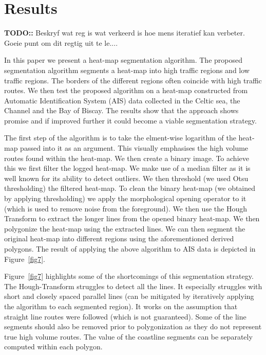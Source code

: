\documentclass{article}
\begin{document}
 
 
 \section{Results}
 \textbf{TODO::} Beskryf wat reg is wat verkeerd is hoe mens iteratief kan verbeter. Goeie punt om dit regtig uit te le....
 
 
In this paper we present a heat-map segmentation algorithm. The proposed segmentation algorithm
segments a heat-map into high traffic regions and low traffic regions. The borders of the different regions often coincide with high traffic routes. We then test the proposed 
algorithm on a heat-map constructed from Automatic Identification System (AIS) data collected in the Celtic sea, the Channel and the Bay of Biscay. The results show that the approach shows promise and if improved further 
it could become a viable segmentation strategy.
 
The first step of the algorithm is to take the elment-wise logarithm of the heat-map passed into it as an argument. This visually emphasises the high volume routes found within the heat-map. We then 
create a binary image. To achieve this we first filter the logged heat-map. We make use of a median filter as it is well known for its ability to detect outliers. We then threshold (we used Otsu thresholding) the  
filtered heat-map. To clean the binary heat-map (we obtained by applying thresholding) we apply the morphological opening operator to it (which is used to remove noise from the foreground).
We then use the Hough Transform to extract the longer lines from the opened binary heat-map. We then polygonize the heat-map using the extracted lines. We can then 
segment the original heat-map into different regions using the aforementioned derived polygons. The result of applying the above algorithm to AIS data is depicted in Figure~\ref{fig7}.


Figure~\ref{fig7} highlights some of the shortcomings of this segmentation strategy. The Hough-Transform struggles to detect all 
the lines. It especially struggles with short and closely spaced parallel lines (can be mitigated by iteratively applying the algorithm to each segmented region). It works on the assumption that straight line routes were followed (which is not guaranteed). Some of the line segments should also be removed prior to polygonization as they do not 
represent true high volume routes. The value of the coastline segments can be separately computed within each polygon.
 
\end{document}
